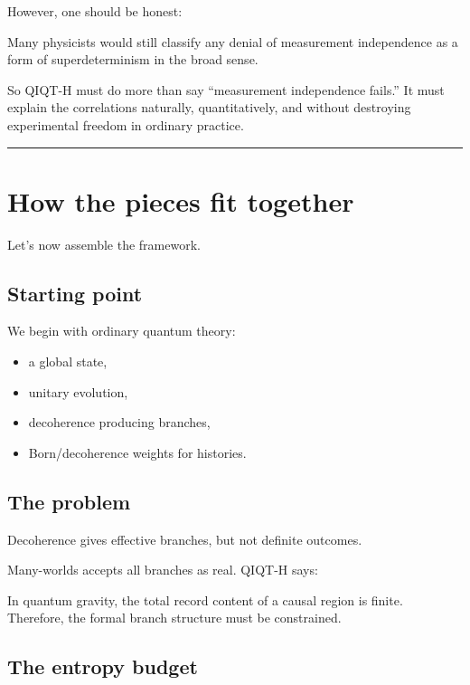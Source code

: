 \documentclass[11pt,a4paper]{article}
\newenvironment{qiqtquote}{\begin{mdframed}[style=quotestyle]}{\end{mdframed}}
\begin{document}
However, one should be honest:

\begin{qiqtquote}
Many physicists would still classify any denial of measurement independence as a form of superdeterminism in the broad sense.
\end{qiqtquote}

So QIQT-H must do more than say “measurement independence fails.” It must explain the correlations naturally, quantitatively, and without destroying experimental freedom in ordinary practice.

\medskip\hrule\medskip

\section{How the pieces fit together}

Let’s now assemble the framework.

\subsection{Starting point}

We begin with ordinary quantum theory:

\begin{itemize}
  \item a global state,
  \item unitary evolution,
  \item decoherence producing branches,
  \item Born/decoherence weights for histories.
\end{itemize}

\subsection{The problem}

Decoherence gives effective branches, but not definite outcomes.

Many-worlds accepts all branches as real. QIQT-H says:

\begin{qiqtquote}
In quantum gravity, the total record content of a causal region is finite. Therefore, the formal branch structure must be constrained.
\end{qiqtquote}

\subsection{The entropy budget}
\end{document}
